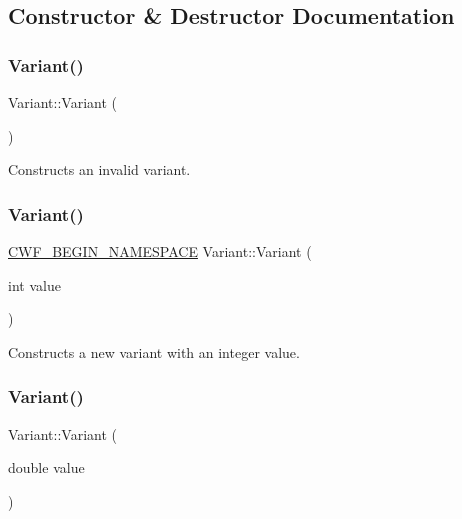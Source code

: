 \subsection{Constructor \& Destructor Documentation}
\mbox{\label{class_variant_a594b84b7c7a7e997aac3354bbdaa2d97}} 
\subsubsection{\texorpdfstring{Variant()}{Variant()}\hspace{0.1cm}{\footnotesize\ttfamily [1/5]}}
{\footnotesize\ttfamily Variant\+::\+Variant (\begin{DoxyParamCaption}{ }\end{DoxyParamCaption})\hspace{0.3cm}{\ttfamily [default]}}



Constructs an invalid variant. 

\mbox{\label{class_variant_a4bca2cf3c097e4fa9aea5c87c947e9a0}} 
\subsubsection{\texorpdfstring{Variant()}{Variant()}\hspace{0.1cm}{\footnotesize\ttfamily [2/5]}}
{\footnotesize\ttfamily \hyperlink{cppwebframework__global_8h_a7492e9498cbaf9cd17dbc2215d3a0e48}{C\+W\+F\+\_\+\+B\+E\+G\+I\+N\+\_\+\+N\+A\+M\+E\+S\+P\+A\+CE} Variant\+::\+Variant (\begin{DoxyParamCaption}\item[{int}]{value }\end{DoxyParamCaption})\hspace{0.3cm}{\ttfamily [explicit]}}



Constructs a new variant with an integer value. 

\mbox{\label{class_variant_a7e7d9a46e166e059ce75b76b92b11457}} 
\subsubsection{\texorpdfstring{Variant()}{Variant()}\hspace{0.1cm}{\footnotesize\ttfamily [3/5]}}
{\footnotesize\ttfamily Variant\+::\+Variant (\begin{DoxyParamCaption}\item[{double}]{value }\end{DoxyParamCaption})\hspace{0.3cm}{\ttfamily [explicit]}}



